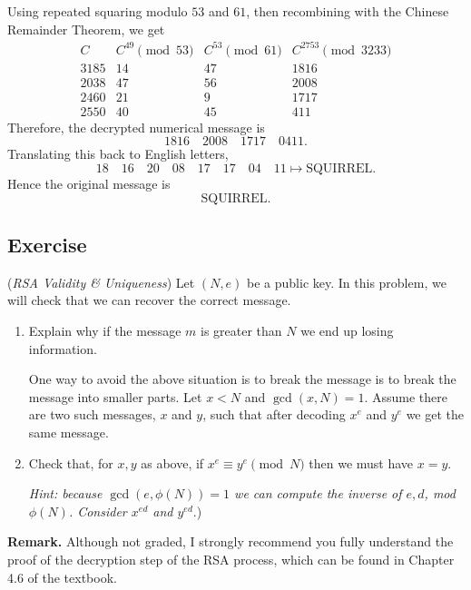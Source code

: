 \documentclass{article}
\newcounter{counter}
\newcommand{\Exercise}{Exercise \stepcounter{counter}\thecounter}
\begin{document}
\begin{enumerate}
        Using repeated squaring modulo $53$ and $61$, then recombining with the Chinese Remainder Theorem, we get
        $$
        \begin{array}{c|c|c|c}
            C & C^{49} \pmod{53} & C^{53} \pmod{61} & C^{2753} \pmod{3233} \\ \hline
            3185 & 14 & 47 & 1816 \\
            2038 & 47 & 56 & 2008 \\
            2460 & 21 & 9 & 1717 \\
            2550 & 40 & 45 & 411
        \end{array}
        $$
        Therefore, the decrypted numerical message is
        $$1816 \quad 2008 \quad 1717 \quad 0411.$$
        Translating this back to English letters,
        $$18 \quad 16 \quad 20 \quad 08 \quad 17 \quad 17 \quad 04 \quad 11
        \mapsto \text{SQUIRREL}.$$
        Hence the original message is
        $$\boxed{\text{SQUIRREL}}.$$
    \end{enumerate}

\subsection*{\Exercise} 
    (\textit{RSA Validity \& Uniqueness}) Let $(N, e)$ be a public key. In this problem, we will check that we can recover the correct message.
    \begin{enumerate}
        \item Explain why if the message $m$ is greater than $N$ we end up losing information.
        
        \vspace{3mm}
        One way to avoid the above situation is to break the message is to break the message into smaller parts. Let $x < N$ and $\gcd(x, N) = 1$. Assume there are two such messages, $x$ and $y$, such that after decoding $x^{e}$ and $y^{e}$ we get the same message.
        \item Check that, for $x, y$ as above, if $x^{e} \equiv y^{e} \pmod{N}$ then we must have $x = y$. 
        
        \vspace{1mm} \textit{Hint: because $\gcd(e, \phi(N)) = 1$ we can compute the inverse of $e, d$, mod $\phi(N)$. Consider $x^{ed}$ and $y^{ed}$}.)
    \end{enumerate}
    
    \textbf{Remark. }Although not graded, I strongly recommend you fully understand the proof of the decryption step of the RSA process, which can be found in Chapter 4.6 of the textbook.
\end{document}
